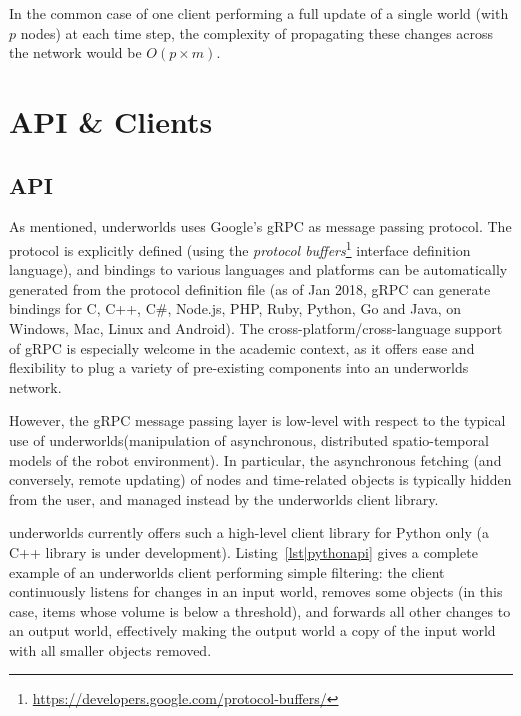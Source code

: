 \documentclass[letterpaper, 10pt, conference]{ieeeconf}
\newcommand{\uwds}{{\sc underworlds}\xspace}
\begin{document}
In the common case of one client performing a full update of a single world
(with $p$ nodes) at each time step, the complexity of propagating these changes across
the network would be $O(p \times m)$.

\section{API \& Clients}

\subsection{API}
\label{api}

As mentioned, \uwds uses Google's gRPC as message passing protocol. The protocol
is explicitly defined (using the \emph{protocol
buffers}\footnote{\url{https://developers.google.com/protocol-buffers/}}
interface definition language), and bindings to various languages and platforms
can be automatically generated from the protocol definition file (as of Jan
2018, gRPC can generate bindings for C, C++, C\#, Node.js, PHP, Ruby, Python, Go
and Java, on Windows, Mac, Linux and Android).  The cross-platform/cross-language support
of gRPC is especially welcome in the academic context, as it offers ease and
flexibility to plug a variety of pre-existing components into an \uwds network.


However, the gRPC message passing layer is low-level with respect to the typical
use of \uwds (manipulation of asynchronous, distributed spatio-temporal models
of the robot environment). In particular, the asynchronous fetching (and
conversely, remote updating) of nodes and time-related objects is typically
hidden from the user, and managed instead by the \uwds client library.

\uwds currently offers such a high-level client library for Python only (a C++
library is under development).  Listing~\ref{lst|pythonapi} gives a complete
example of an \uwds client performing simple filtering: the client continuously
listens for changes in an input world, removes some objects (in this case, items
whose volume is below a threshold), and forwards all other changes to
an output world, effectively making the output world a copy of the input world
with all smaller objects removed.
\end{document}
